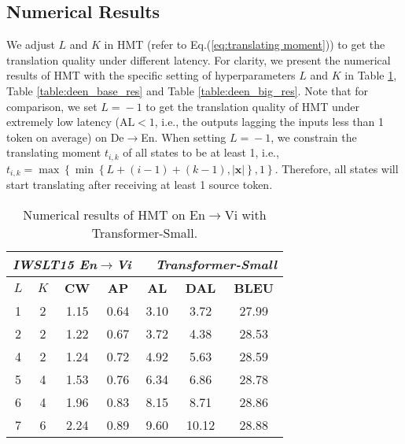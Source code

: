 \documentclass{article} %
\begin{document}
\subsection{Numerical Results}

We adjust $L$ and $K$ in HMT (refer to Eq.(\ref{eq:translating moment})) to get the translation quality under different latency. For clarity, we present the numerical results of HMT with the specific setting of hyperparameters $L$ and $K$ in Table \ref{table:envi_small_res}, Table \ref{table:deen_base_res} and Table \ref{table:deen_big_res}.
Note that for comparison, we set $L\!=\!-1$ to get the translation quality of HMT under extremely low latency ($\text{AL}\!<\!1$, i.e., the outputs lagging the inputs less than 1 token on average) on De$\rightarrow$En. When setting $L\!=\!-1$, we constrain the translating moment $t_{i,k}$ of all states to be at least 1, i.e., $t_{i,k}=\max\left\{\min\left\{ L+\left ( i-1 \right )+\left ( k-1 \right ), \left| \mathbf{x}\right|\right\},1\right\}$. Therefore, all states will start translating after receiving at least 1 source token.

\begin{table}[h]
\small
\centering
\caption{Numerical results of HMT on En$\rightarrow$Vi with Transformer-Small.}
\label{table:envi_small_res}
\vspace{-0.05in}
\begin{tabular}{cc|cccc|c} \hline
\multicolumn{7}{c}{\textit{\textbf{IWSLT15 En$\rightarrow$Vi $\;\;\;\;$  Transformer-Small}}}                                  \\\hline
$L$ & $K$ & \textbf{CW} & \textbf{AP} & \textbf{AL} & \textbf{DAL} & \textbf{BLEU} \\ \hline
1          & 2          & 1.15        & 0.64        & 3.10        & 3.72         & 27.99         \\
2          & 2          & 1.22        & 0.67        & 3.72        & 4.38         & 28.53         \\
4          & 2          & 1.24        & 0.72        & 4.92        & 5.63         & 28.59         \\
5          & 4          & 1.53        & 0.76        & 6.34        & 6.86         & 28.78         \\
6          & 4          & 1.96        & 0.83        & 8.15        & 8.71         & 28.86         \\
7          & 6          & 2.24        & 0.89        & 9.60        & $\!\!\!$10.12        & 28.88        \\\hline
\end{tabular}
\end{table}
\end{document}
